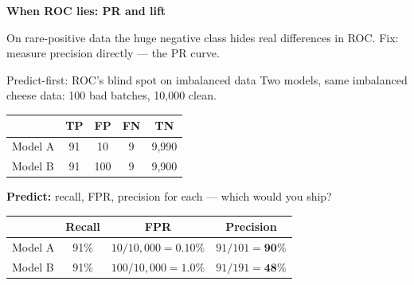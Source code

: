 \documentclass[aspectratio=169]{beamer}
\begin{document}
\begin{frame}[plain]
  \vfill
  \begin{center}
    {\Large\color{popblue}\textbf{When ROC lies: PR and lift}}\\[0.9em]
    \begin{minipage}{0.82\textwidth}\centering\small
      On rare-positive data the huge negative class hides real differences in ROC.
      Fix: measure precision directly --- the PR curve.
    \end{minipage}
  \end{center}
  \vfill
\end{frame}

\begin{frame}{Predict-first: ROC's blind spot on imbalanced data}
  Two models, same imbalanced cheese data: 100 bad batches, 10{,}000 clean.
  \vfill
  \begin{center}\small
    \begin{tabular}{lcccc}
      & \textbf{TP} & \textbf{FP} & \textbf{FN} & \textbf{TN} \\ \hline
      Model A & 91 & 10 & 9 & 9{,}990 \\
      Model B & 91 & 100 & 9 & 9{,}900 \\
    \end{tabular}
  \end{center}
  \vfill
  \textbf{Predict:} recall, FPR, precision for each --- which would you ship?
  \vfill
  \begin{center}\small
    \begin{tabular}{lccc}
      & \textbf{Recall} & \textbf{FPR} & \textbf{Precision} \\ \hline
      Model A & 91\% & $10/10{,}000 = \mathbf{0.10\%}$ & $91/101 = \mathbf{90\%}$ \\
      Model B & 91\% & $100/10{,}000 = \mathbf{1.0\%}$ & $91/191 = \mathbf{48\%}$ \\
    \end{tabular}
  \end{center}
  \vfill
\end{frame}
\end{document}
